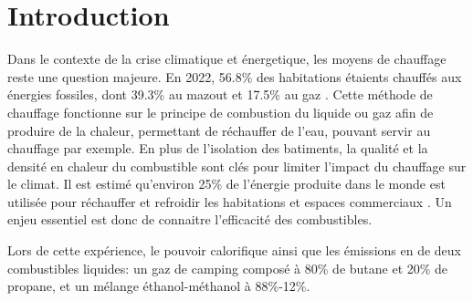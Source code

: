 \section{Introduction}

Dans le contexte de la crise climatique et énergetique, les moyens de chauffage reste une question majeure. En 2022, 56.8\% des habitations étaients chauffés aux énergies fossiles, dont 39.3\% au mazout et 17.5\% au gaz \cite{chauffage}. Cette méthode de chauffage fonctionne sur le principe de combustion du liquide ou gaz afin de produire de la chaleur, permettant de réchauffer de l'eau, pouvant servir au chauffage par exemple. En plus de l'isolation des batiments, la qualité et la densité en chaleur du combustible sont clés pour limiter l'impact du chauffage sur le climat. Il est estimé qu'environ 25\% de l'énergie produite dans le monde est utilisée pour réchauffer et refroidir les habitations et espaces commerciaux \cite{energie-chauffage}. Un enjeu essentiel est donc de connaitre l'efficacité des combustibles.

Lors de cette expérience, le pouvoir calorifique ainsi que les émissions en  de deux combustibles liquides: un gaz de camping composé à 80\% de butane et 20\% de propane, et un mélange éthanol-méthanol à 88\%-12\%.